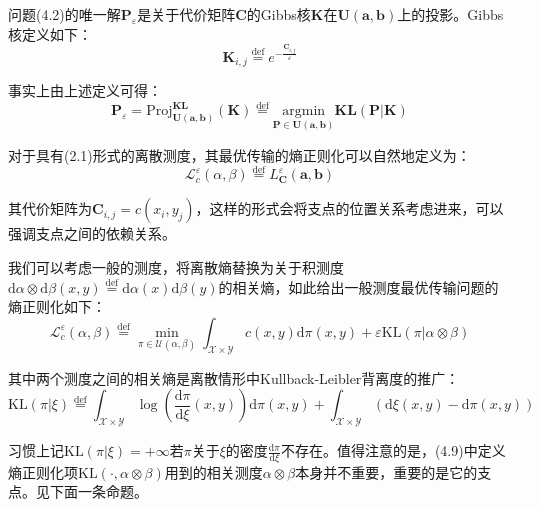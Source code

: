 \documentclass[cn,10pt,math=newtx,citestyle=gb7714-2015,bibstyle=gb7714-2015]{elegantbook}
\begin{document}
问题(4.2)的唯一解$\mathbf{P}_\varepsilon$是关于代价矩阵$\mathbf{C}$的Gibbs核$\mathbf{K}$在$\mathbf{U(a,b)}$上的投影。Gibbs核定义如下：
\begin{equation*}
    \mathbf{K}_{i,j} \overset{\text{def}}{=} e^{-\frac{\mathbf{C}_{i,j}}{\varepsilon}}
\end{equation*}

事实上由上述定义可得：
\begin{equation}
    \label{4.7}
    \mathbf{P}_\varepsilon = \text{Proj}_{\mathbf{U(a,b)}}^{\mathbf{KL}}(\mathbf{K})  \overset{\text{def}}{=} \text{argmin}\limits_{\mathbf{P}\in \mathbf{U(a,b)}} \mathbf{KL(P|K)}
\end{equation}

\begin{postulate}[离散测度的熵正则化]
对于具有(2.1)形式的离散测度，其最优传输的熵正则化可以自然地定义为：
\begin{equation}
    \label{4.8}
    \mathcal{L}_c^\varepsilon(\alpha,\beta) \overset{\text{def}}{=} L_\mathbf{C}^\varepsilon(\mathbf{a,b})
\end{equation}

其代价矩阵为$\mathbf{C}_{i,j}=c(x_i,y_j)$，这样的形式会将支点的位置关系考虑进来，可以强调支点之间的依赖关系。
\end{postulate}

\begin{postulate}[一般测度的最优传输问题熵正则化]
我们可以考虑一般的测度，将离散熵替换为关于积测度$\text{d}\alpha\otimes \text{d}\beta(x,y) \overset{\text{def}}{=} \text{d}\alpha(x)\text{d}\beta(y)$的相关熵，如此给出一般测度最优传输问题的熵正则化如下：
\begin{equation}
    \label{4.9}
    \mathcal{L}_c^\varepsilon(\alpha,\beta) \overset{\text{def}}{=}\min\limits_{\pi\in\mathcal{U}(\alpha,\beta)}\int_{\mathcal{X}\times \mathcal{Y}}c(x,y)\text{d}\pi(x,y) + \varepsilon \text{KL}(\pi|\alpha\otimes \beta)
\end{equation}

其中两个测度之间的相关熵是离散情形中Kullback-Leibler背离度的推广：
\begin{equation}
    \label{4.10}
    \text{KL}(\pi|\xi) \overset{\text{def}}{=} \int_{\mathcal{X}\times \mathcal{Y}} \log\left( \frac{\text{d}\pi}{\text{d}\xi}(x,y) \right)\text{d}\pi(x,y) + \int_{\mathcal{X}\times \mathcal{Y}} (\text{d}\xi(x,y)-\text{d}\pi(x,y))
\end{equation}

习惯上记$\text{KL}(\pi|\xi)=+\infty$若$\pi$关于$\xi$的密度$\frac{\text{d}\pi}{\text{d}\xi}$不存在。值得注意的是，(4.9)中定义熵正则化项$\text{KL}(\cdot, \alpha\otimes \beta)$用到的相关测度$\alpha\otimes \beta$本身并不重要，重要的是它的支点。见下面一条命题。
\end{postulate}
\end{document}

